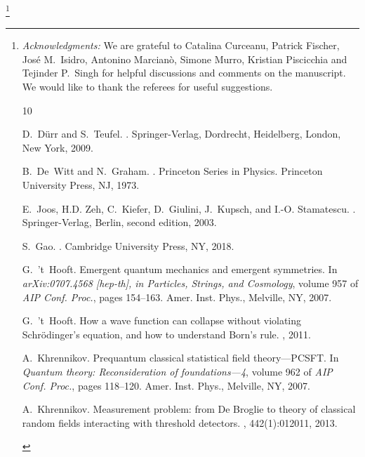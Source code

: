 \documentclass[reqno,11pt]{amsart}
\numberwithin{equation}{section}
\newcommand{\Thanks}{\vspace*{.5em} \noindent \thanks}
\newcommand{\1}{\mathds{1}}
\begin{document}
{

\Thanks{{{\em{Acknowledgments:}} We are grateful to Catalina Curceanu, Patrick Fischer, Jos{\'e} M.\ Isidro,  Antonino Marcian{\`o}, Simone Murro, Kristian Piscicchia and Tejinder P.\ Singh for helpful discussions
and comments on the manuscript. We would like to thank the referees for useful suggestions.

%
%
%
\begin{thebibliography}{10}

D.~D\"urr and S.~Teufel.
.
\newblock Springer-Verlag, Dordrecht, Heidelberg, London, New York, 2009.

B.~De~Witt and N.~Graham.
.
\newblock Princeton Series in Physics. Princeton University Press, NJ, 1973.

E.~Joos, H.D. Zeh, C.~Kiefer, D.~Giulini, J.~Kupsch, and I.-O. Stamatescu.
.
\newblock Springer-Verlag, Berlin, second edition, 2003.

S.~Gao.
.
\newblock Cambridge University Press, NY, 2018.

G.~'t~Hooft.
\newblock Emergent quantum mechanics and emergent symmetries.
\newblock In {\em arXiv:0707.4568 [hep-th], in Particles, {S}trings, and
  {C}osmology}, volume 957 of {\em AIP Conf. Proc.}, pages 154--163. Amer.
  Inst. Phys., Melville, NY, 2007.

G.~'t~Hooft.
\newblock How a wave function can collapse without violating {S}chr\"odinger's
  equation, and how to understand {B}orn's rule.
, 2011.

A.~Khrennikov.
\newblock Prequantum classical statistical field theory---{PCSFT}.
\newblock In {\em Quantum theory: Reconsideration of foundations---4}, volume
  962 of {\em AIP Conf. Proc.}, pages 118--120. Amer. Inst. Phys., Melville,
  NY, 2007.

A.~Khrennikov.
\newblock Measurement problem: from {D}e {B}roglie to theory of classical
  random fields interacting with threshold detectors.
, 442(1):012011, 2013.


\end{thebibliography}}}}
\end{document}
